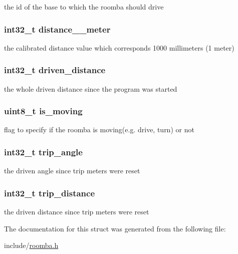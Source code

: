 the id of the base to which the roomba should drive \hypertarget{structroomba__data_aa2702f293fb9d49b8c1d60303ca5ba63}{
\subsubsection[{distance\-\_\-1\-\_\-meter}]{\setlength{\rightskip}{0pt plus 5cm}int32\-\_\-t {\bf distance\-\_\-\_\-meter}}}\label{structroomba__data_aa2702f293fb9d49b8c1d60303ca5ba63}
the calibrated distance value which corresponds 1000 millimeters (1 meter) \hypertarget{structroomba__data_a9874cc3ce685901b1a022c32751fff3e}{
\subsubsection[{driven\-\_\-distance}]{\setlength{\rightskip}{0pt plus 5cm}int32\-\_\-t {\bf driven\-\_\-distance}}}\label{structroomba__data_a9874cc3ce685901b1a022c32751fff3e}
the whole driven distance since the program was started \hypertarget{structroomba__data_a27949ed7575f6665baf658b206ba9cff}{
\subsubsection[{is\-\_\-moving}]{\setlength{\rightskip}{0pt plus 5cm}uint8\-\_\-t {\bf is\-\_\-moving}}}\label{structroomba__data_a27949ed7575f6665baf658b206ba9cff}
flag to specify if the roomba is moving(e.\-g. drive, turn) or not \hypertarget{structroomba__data_aaa13920a13096418bc196e4b464df213}{
\subsubsection[{trip\-\_\-angle}]{\setlength{\rightskip}{0pt plus 5cm}int32\-\_\-t {\bf trip\-\_\-angle}}}\label{structroomba__data_aaa13920a13096418bc196e4b464df213}
the driven angle since trip meters were reset \hypertarget{structroomba__data_a22f88fbf731f115d1c35906dd65a9293}{
\subsubsection[{trip\-\_\-distance}]{\setlength{\rightskip}{0pt plus 5cm}int32\-\_\-t {\bf trip\-\_\-distance}}}\label{structroomba__data_a22f88fbf731f115d1c35906dd65a9293}
the driven distance since trip meters were reset 

\-The documentation for this struct was generated from the following file\-:\begin{DoxyCompactItemize}
\item 
include/\hyperlink{roomba_8h}{roomba.\-h}\end{DoxyCompactItemize}

